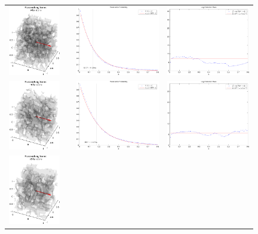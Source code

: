 \begin{figure}
\begin{tabular}{cccc}
\includegraphics[height=1.2in]{Penetration/ising_cell_009.png} &&
\includegraphics[height=1.2in]{Penetration/ising_penetration_009} &
\includegraphics[height=1.2in]{Penetration/ising_extinction_009}\\
\includegraphics[height=1.2in]{Penetration/ising_cell_016.png} &&
\includegraphics[height=1.2in]{Penetration/ising_penetration_016} &
\includegraphics[height=1.2in]{Penetration/ising_extinction_016}\\
\includegraphics[height=1.2in]{Penetration/ising_cell_025.png} &&

\end{tabular}
\end{figure}
